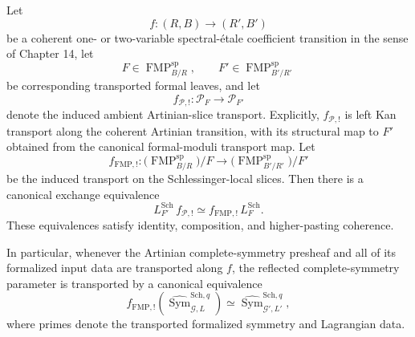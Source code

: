 \begin{proposition}
\label{prop:symmetry-noether-spectral-etale-exchange-for-relative-unstable-schlessinger-reflector}
Let
\[
f:(R,B)\longrightarrow(R',B')
\]
be a coherent one- or two-variable spectral-\'etale coefficient transition in the
sense of Chapter 14, let
\[
F\in\operatorname{FMP}^{\mathrm{sp}}_{B/R},
\qquad
F'\in\operatorname{FMP}^{\mathrm{sp}}_{B'/R'}
\]
be corresponding transported formal leaves, and let
\[
f_{\mathcal P,!}:\mathcal P_F\longrightarrow\mathcal P_{F'}
\]
denote the induced ambient Artinian-slice transport.  Explicitly,
$f_{\mathcal P,!}$ is left Kan transport along the coherent Artinian transition,
with its structural map to $F'$ obtained from the canonical formal-moduli transport
map.  Let
\[
f_{\mathrm{FMP},!}:
\bigl(\operatorname{FMP}^{\mathrm{sp}}_{B/R}\bigr)/F
\longrightarrow
\bigl(\operatorname{FMP}^{\mathrm{sp}}_{B'/R'}\bigr)/F'
\]
be the induced transport on the Schlessinger-local slices.  Then there is a
canonical exchange equivalence
\[
\boxed{
L_{F'}^{\mathrm{Sch}}\,f_{\mathcal P,!}
\simeq
f_{\mathrm{FMP},!}\,L_F^{\mathrm{Sch}}.
}
\]
These equivalences satisfy identity, composition, and higher-pasting coherence.

In particular, whenever the Artinian complete-symmetry presheaf and all of its
formalized input data are transported along $f$, the reflected complete-symmetry
parameter is transported by a canonical equivalence
\[
f_{\mathrm{FMP},!}
\left(
\widehat{\operatorname{Sym}}_{\mathcal G,L}^{\mathrm{Sch},q}
\right)
\simeq
\widehat{\operatorname{Sym}}_{\mathcal G',L'}^{\mathrm{Sch},q},
\]
where primes denote the transported formalized symmetry and Lagrangian data.
\end{proposition}

